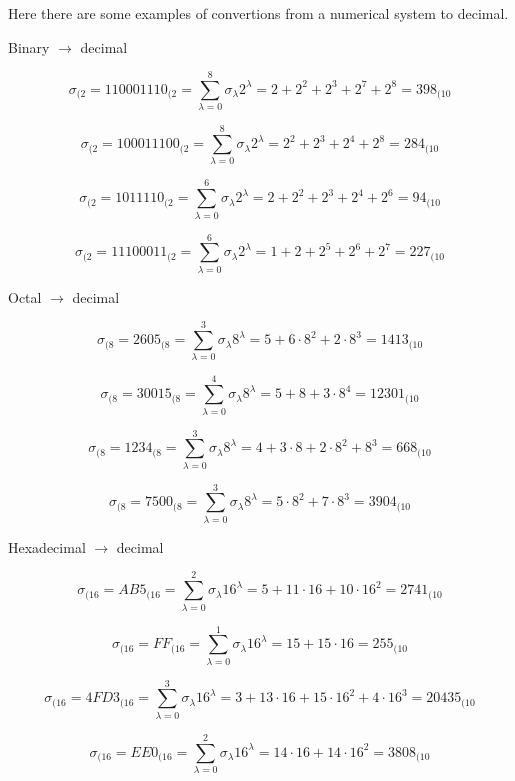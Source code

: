\documentclass[12pt]{article}
\begin{document}
\pagebreak

Here there are some examples of convertions from a numerical system to decimal.

Binary \( \to \) decimal

\[
	\sigma_{(2} = 110001110_{(2} = \sum_{\lambda = 0}^{8} \sigma_{\lambda} 2^{\lambda} = 2 + 2^{2} + 2^{3} + 2^{7} + 2^{8} = 398_{(10}
\]

\[
	\sigma_{(2} = 100011100_{(2} = \sum_{\lambda = 0}^{8} \sigma_{\lambda} 2^{\lambda} = 2^{2} + 2^{3} + 2^{4} + 2^{8} = 284_{(10}
\]

\[
	\sigma_{(2} = 1011110_{(2} = \sum_{\lambda = 0}^{6} \sigma_{\lambda} 2^{\lambda} = 2 + 2^{2} + 2^{3} + 2^{4} + 2^{6} = 94_{(10}
\]

\[
	\sigma_{(2} = 11100011_{(2} = \sum_{\lambda = 0}^{6} \sigma_{\lambda} 2^{\lambda} = 1 + 2 + 2^{5} + 2^{6} + 2^{7} = 227_{(10}
\]

Octal \( \to \) decimal

\[
	\sigma_{(8} = 2605_{(8} = \sum_{\lambda = 0}^{3} \sigma_{\lambda} 8^{\lambda} = 5 + 6 \cdot 8^{2} + 2 \cdot 8^{3} = 1413_{(10}
\]

\[
	\sigma_{(8} = 30015_{(8} = \sum_{\lambda = 0}^{4} \sigma_{\lambda} 8^{\lambda} = 5 + 8 + 3 \cdot 8^{4} = 12301_{(10}
\]

\[
	\sigma_{(8} = 1234_{(8} = \sum_{\lambda = 0}^{3} \sigma_{\lambda} 8^{\lambda} = 4 + 3 \cdot 8 + 2 \cdot 8^{2} + 8^{3} = 668_{(10}
\]

\[
	\sigma_{(8} = 7500_{(8} = \sum_{\lambda = 0}^{3} \sigma_{\lambda} 8^{\lambda} = 5 \cdot 8^{2} + 7 \cdot 8^{3} = 3904_{(10}
\]

Hexadecimal \( \to \) decimal

\[
	\sigma_{(16} = AB5_{(16} = \sum_{\lambda = 0}^{2} \sigma_{\lambda} 16^{\lambda} = 5 + 11 \cdot 16 + 10 \cdot 16^{2} = 2741_{(10}
\]

\[
	\sigma_{(16} = FF_{(16} = \sum_{\lambda = 0}^{1} \sigma_{\lambda} 16^{\lambda} = 15 + 15 \cdot 16 = 255_{(10}
\]

\[
	\sigma_{(16} = 4FD3_{(16} = \sum_{\lambda = 0}^{3} \sigma_{\lambda} 16^{\lambda} = 3 + 13 \cdot 16 + 15 \cdot 16 ^ {2} + 4 \cdot 16^{3} = 20435_{(10}
\]

\[
	\sigma_{(16} = EE0_{(16} = \sum_{\lambda = 0}^{2} \sigma_{\lambda} 16^{\lambda} = 14 \cdot 16 + 14 \cdot 16^{2} = 3808_{(10}
\]
\end{document}
